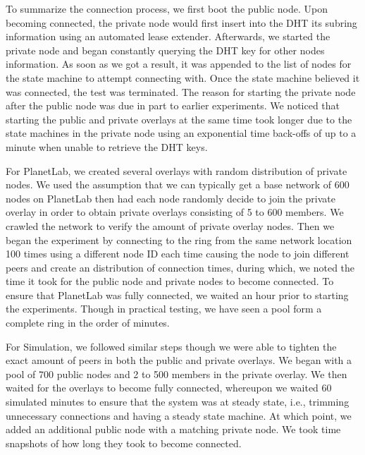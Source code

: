 \documentclass[conference]{IEEEtran}
\begin{document}
To summarize the connection process, we first boot the public node.  Upon
becoming connected, the private node would first insert into the DHT its 
subring information using an automated lease extender.  Afterwards, we
started the private node and began constantly querying the DHT key for other
nodes information.  As soon as we got a result, it was appended to the list of
nodes for the state machine to attempt connecting with.  Once the state machine
believed it was connected, the test was terminated.  The reason for starting
the private node after the public node was due in part to earlier experiments.
We noticed that starting the public and private overlays at the same time took
longer due to the state machines in the private node using an exponential time
back-offs of up to a minute when unable to retrieve the DHT keys.

For PlanetLab, we created several overlays with random distribution of private
nodes.  We used the assumption that we can typically get a base network of
600 nodes on PlanetLab then had each node randomly decide to join the private
overlay in order to obtain private overlays consisting of 5 to 600 members.  We
crawled the network to verify the amount of private overlay nodes.  Then we began
the experiment by connecting to the ring from the same network location 100 times
using a different node ID each time causing the node to join different peers and
create an distribution of connection times, during which, we noted the time it
took for the public node and private nodes to become connected.  To ensure that
PlanetLab was fully connected, we waited an hour prior to starting the
experiments.  Though in practical testing, we have seen a pool form a complete
ring in the order of minutes.

For Simulation, we followed similar steps though we were able to tighten the
exact amount of peers in both the public and private overlays.  We began with a
pool of 700 public nodes and 2 to 500 members in the private overlay.  We then
waited for the overlays to become fully connected, whereupon we waited 60
simulated minutes to ensure that the system was at steady state, i.e., trimming
unnecessary connections and having a steady state machine.  At which point, we
added an additional public node with a matching private node.  We took time
snapshots of how long they took to become connected.
\end{document}
